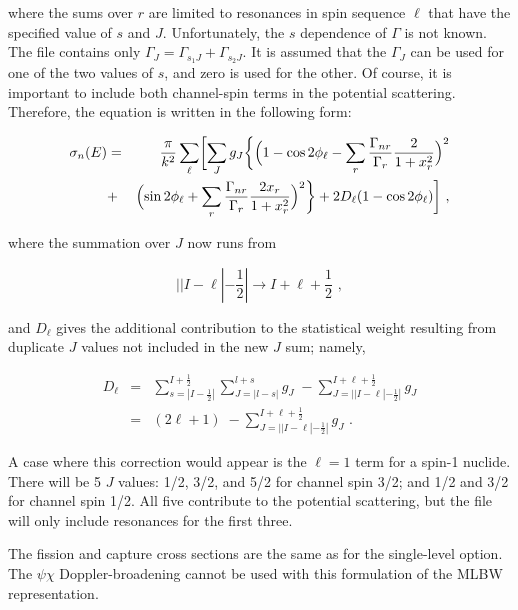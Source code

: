\noindent
where the sums over $r$ are limited to resonances in spin
sequence $\ell$ that have the specified value of $s$ and $J$.
Unfortunately, the $s$ dependence of $\Gamma$ is not known.
The file contains only $\Gamma_J{=}\Gamma_{s_1J}{+}\Gamma_{s_2J}$.
It is assumed that the $\Gamma_J$ can be used for one of the
two values of $s$, and zero is used for the other.  Of course,
it is important to include both channel-spin terms in the
potential scattering.  Therefore, the equation is written in
the following form:

\begin{eqnarray}
  \sigma_{n}(E)&=&{\frac{\pi}{k^2}}
    \sum_\ell \biggl[
    \sum_J g_J \biggl\lbrace \Bigl( 1-\cos 2\phi_\ell -
    \sum_r {{\Gamma_{nr}}\over{\Gamma_r}}
    {2\over{1+x_r^2}} \Bigr)^2\nonumber\\
   &+&\Bigl(\sin 2\phi_\ell
    +\sum_r {{\Gamma_{nr}}\over{\Gamma_r}}
    {\frac{2x_r}{1+x_r^2}} \Bigr)^2 \biggr\rbrace
    +2D_\ell(1-\cos 2\phi_\ell) \biggr] \,\,,
\end{eqnarray}

\noindent where the summation over $J$ now runs from

\begin{equation}
   ||I-\ell|-\frac{1}{2}| \rightarrow I+\ell+\frac{1}{2} \,\,,
\end{equation}

\noindent and $D_\ell$ gives the additional contribution to the
statistical weight resulting from duplicate $J$ values not
included in the new $J$ sum; namely,

\begin{eqnarray}
   D_\ell&=&
    \sum_{s=|I-\frac{1}{2}|}^{I+\frac{1}{2}}
    \sum_{J=|l-s|}^{l+s} g_J \;
    -\sum_{J=||I-\ell|-\frac{1}{2}|}^{I+\ell+\frac{1}{2}} g_J \\
    &=&(2\ell+1) \;
    -\sum_{J=||I-\ell|-\frac{1}{2}|}^{I+\ell+\frac{1}{2}} g_J\,\,.
\label{missing}
\end{eqnarray}

\noindent
A case where this correction would appear is the $\ell{=}1$ term
for a spin-1 nuclide.  There will be 5 $J$ values:  1/2, 3/2, and
5/2 for channel spin 3/2; and 1/2 and 3/2 for channel spin 1/2.
All five contribute to the potential scattering, but the file
will only include resonances for the first three.

The fission and capture cross sections are the same as for the
single-level option.  The $\psi\chi$ Doppler-broadening cannot be
used with this formulation of the MLBW representation.

